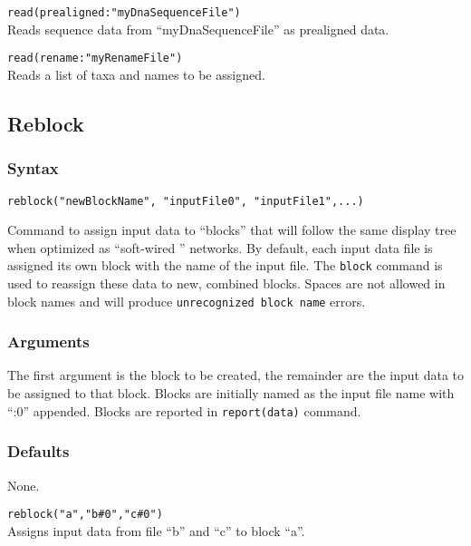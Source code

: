 	\begin{example}
		
		\item{\texttt{read(prealigned:"myDnaSequenceFile")}\\ Reads sequence data from 
		``myDnaSequenceFile'' as prealigned data.}
		
		\item{\texttt{read(rename:"myRenameFile")}\\ Reads a list of taxa and names to be assigned.} 
		
	\end{example}
		
\subsection{Reblock}
	\subsubsection{Syntax}
		\texttt{reblock("newBlockName", "inputFile0", "inputFile1",...)}
	
	\begin{phygdescription}
	{Command to assign input data to ``blocks'' that will follow the same display tree when optimized
	as ``soft-wired '' networks. By default, each input data file is assigned its own block with the name
	of the input file. The \texttt{block} command is used to reassign these data to new, combined blocks.
	Spaces are not allowed in block names and will produce \texttt{unrecognized block name} errors.}  
	\end{phygdescription}
	
	\subsubsection{Arguments}
		The first argument is the block to be created, the remainder are the input data to be 
		assigned to that block. Blocks are initially named as the input file name with ``:0'' appended. 
		Blocks are reported in \texttt{report(data)} command.
	
	\subsubsection{Defaults}
		None.
	
	\begin{example}

		\item{\texttt{reblock("a","b\#0","c\#0")}\\ Assigns input data from file ``b'' and ``c'' to block ``a''. }
	
	\end{example}

